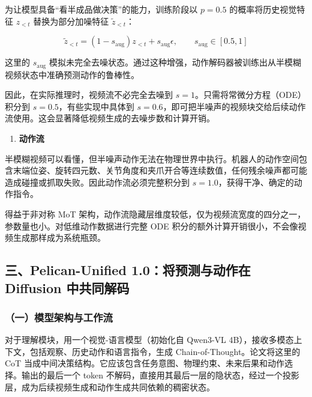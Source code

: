 为让模型具备``看半成品做决策''的能力，训练阶段以 \(p=0.5\) 的概率将历史视觉特征 \(z_{\lt t}\) 替换为部分加噪特征 \(\tilde{z}_{\lt t}\)：

\[
\tilde{z}_{\lt t} = (1-s_{\mathrm{aug}})z_{\lt t} + s_{\mathrm{aug}}\epsilon,
\qquad s_{\mathrm{aug}} \in [0.5, 1]
\]

这里的 \(s_{\mathrm{aug}}\) 模拟未完全去噪状态。通过这种增强，动作解码器被训练出从半模糊视频状态中准确预测动作的鲁棒性。

因此，在实际推理时，视频流不必完全去噪到 \(s=1\)。只需将常微分方程（ODE）积分到 \(s=0.5\)，有些实现中具体到 \(s=0.6\)，即可把半噪声的视频块交给后续动作流使用。这会显著降低视频生成的去噪步数和计算开销。

\begin{enumerate}
\def\labelenumi{\arabic{enumi}.}
\setcounter{enumi}{1}
\tightlist
\item
  \textbf{动作流}
\end{enumerate}

半模糊视频可以看懂，但半噪声动作无法在物理世界中执行。机器人的动作空间包含末端位姿、旋转四元数、关节角度和夹爪开合等连续数值，任何残余噪声都可能造成碰撞或抓取失败。因此动作流必须完整积分到 \(s=1.0\)，获得干净、确定的动作指令。

得益于非对称 MoT 架构，动作流隐藏层维度较低，仅为视频流宽度的四分之一，参数量也小。对低维动作数据进行完整 ODE 积分的额外计算开销很小，不会像视频生成那样成为系统瓶颈。

\hypertarget{ux4e09pelican-unified-1.0ux5c06ux9884ux6d4bux4e0eux52a8ux4f5cux5728-diffusion-ux4e2dux5171ux540cux89e3ux7801}{%
\subsection{三、Pelican-Unified 1.0：将预测与动作在 Diffusion 中共同解码}\label{ux4e09pelican-unified-1.0ux5c06ux9884ux6d4bux4e0eux52a8ux4f5cux5728-diffusion-ux4e2dux5171ux540cux89e3ux7801}}

\hypertarget{ux4e00ux6a21ux578bux67b6ux6784ux4e0eux5de5ux4f5cux6d41-1}{%
\subsubsection{（一）模型架构与工作流}\label{ux4e00ux6a21ux578bux67b6ux6784ux4e0eux5de5ux4f5cux6d41-1}}

对于理解模块，用一个视觉-语言模型（初始化自 Qwen3-VL 4B），接收多模态上下文，包括观察、历史动作和语言指令，生成 Chain-of-Thought。论文将这里的 CoT 当成中间决策结构。它应该包含任务意图、物理约束、未来后果和动作选择。输出的最后一个 token 不解码，直接用其最后一层的隐状态，经过一个投影层，成为后续视频生成和动作生成共同依赖的稠密状态。

